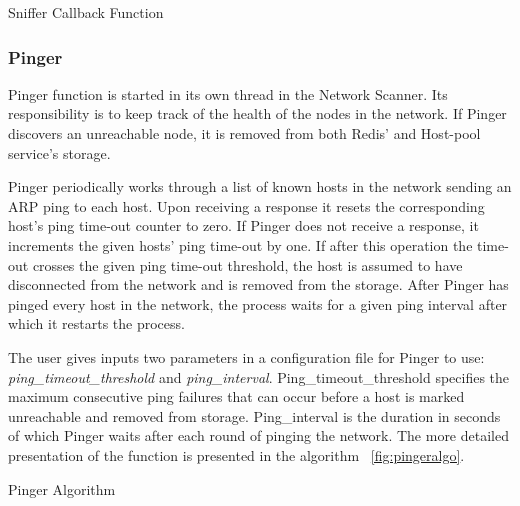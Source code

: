\begin{algorithm}[H]
\label{fig:snifferalgo}
\begin{center}
\end{center}
\caption{Sniffer Callback Function}
\end{algorithm}

\subsubsection{Pinger} \label{pinger}

Pinger function is started in its own thread in the Network Scanner. Its responsibility is to keep track of the health of the nodes in the network. If Pinger discovers an unreachable node, it is removed from both Redis' and Host-pool service's storage.

Pinger periodically works through a list of known hosts in the network sending an ARP ping to each host. Upon receiving a response it resets the corresponding host's ping time-out counter to zero. If Pinger does not receive a response, it increments the given hosts' ping time-out by one. If after this operation the time-out crosses the given ping time-out threshold, the host is assumed to have disconnected from the network and is removed from the storage. After Pinger has pinged every host in the network, the process waits for a given ping interval after which it restarts the process.

The user gives inputs two parameters in a configuration file for Pinger to use: \textit{ping\_timeout\_threshold} and \textit{ping\_interval}. Ping\_timeout\_threshold specifies the maximum consecutive ping failures that can occur before a host is marked unreachable and removed from storage. Ping\_interval is the duration in seconds of which Pinger waits after each round of pinging the network. The more detailed presentation of the function is presented in the algorithm ~\ref{fig:pingeralgo}.

\begin{algorithm}[H]
\label{fig:pingeralgo}
\begin{center}
\end{center}


\caption{Pinger Algorithm}

\end{algorithm}

